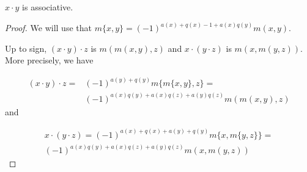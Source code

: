 \documentclass[twoside]{article}
\begin{document}
\begin{lemma}
$x\cdot y$ is associative.
\end{lemma}
\begin{proof}
%
%
We will use that $m\{x,y\}=(-1)^{a(x)+q(x)-1+a(x)q(y)}m(x,y)$.

Up to sign, $(x\cdot y)\cdot z$ is $m(m(x,y),z)$ and $x\cdot (y\cdot z)$ is $m(x,m(y,z))$. More precisely, we have

\begin{align*}
(x\cdot y)\cdot z=&(-1)^{a(y)+q(y)}m\{m\{x,y\},z\}=\\
&(-1)^{a(x)q(y)+a(x)q(z)+a(y)q(z)}m(m(x,y),z)
\end{align*}
and

\begin{align*}x\cdot (y\cdot z)=(-1)^{a(x)+q(x)+a(y)+q(y)}m\{x,m\{y,z\}\}=\\
(-1)^{a(x)q(y)+a(x)q(z)+a(y)q(z)}m(x,m(y,z))
\end{align*}


%










\end{proof}
\end{document}
